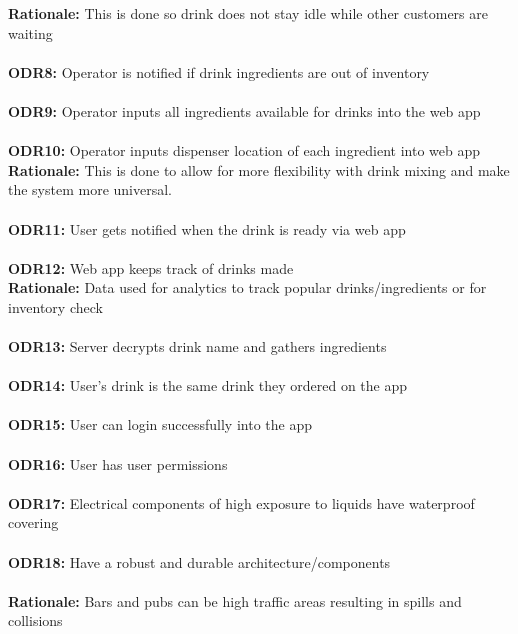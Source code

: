\documentclass{article}
\begin{document}
    \textbf{Rationale:} This is done so drink does not stay idle while other customers are waiting\\\\
    \textbf{ODR8:} Operator is notified if drink ingredients are out of inventory\\\\
    \textbf{ODR9:} Operator inputs all ingredients available for drinks into the web app\\\\
    \textbf{ODR10:} Operator inputs dispenser location of each ingredient into web app\\
    
    \textbf{Rationale:} This is done to allow for more flexibility with drink mixing and make the system more universal.\\\\
    \textbf{ODR11:} User gets notified when the drink is ready via web app\\\\
    \textbf{ODR12:} Web app keeps track of drinks made\\

    \textbf{Rationale:} Data used for analytics to track popular drinks/ingredients or for inventory check\\\\
    \textbf{ODR13:} Server decrypts drink name and gathers ingredients\\\\
    \textbf{ODR14:} User's drink is the same drink they ordered on the app \\\\
    \textbf{ODR15:} User can login successfully into the app \\\\
    \textbf{ODR16:} User has user permissions  \\\\
    \textbf{ODR17:} Electrical components of high exposure to liquids have waterproof covering\\\\
    \textbf{ODR18:} Have a robust and durable architecture/components\\\\
    \indent\textbf{Rationale:} Bars and pubs can be high traffic areas resulting in spills and collisions\\
\end{document}
